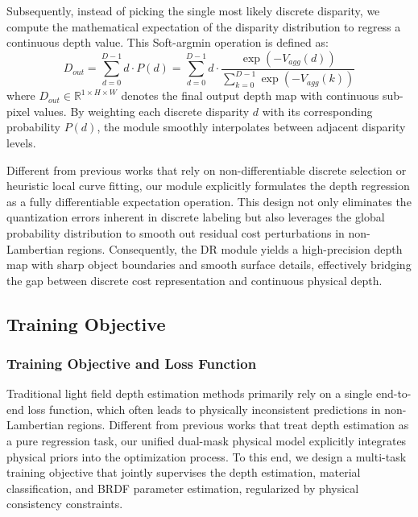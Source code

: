 Subsequently, instead of picking the single most likely discrete disparity, we compute the mathematical expectation of the disparity distribution to regress a continuous depth value. This Soft-argmin operation is defined as:
\begin{equation}
\label{eq:eq42}
D_{out} = \sum_{d=0}^{D-1} d \cdot P(d) = \sum_{d=0}^{D-1} d \cdot \frac{\exp(-V_{agg}(d))}{\sum_{k=0}^{D-1} \exp(-V_{agg}(k))}
\end{equation}
where $D_{out} \in \mathbb{R}^{1 \times H \times W}$ denotes the final output depth map with continuous sub-pixel values. By weighting each discrete disparity $d$ with its corresponding probability $P(d)$, the module smoothly interpolates between adjacent disparity levels.

Different from previous works that rely on non-differentiable discrete selection or heuristic local curve fitting, our module explicitly formulates the depth regression as a fully differentiable expectation operation. This design not only eliminates the quantization errors inherent in discrete labeling but also leverages the global probability distribution to smooth out residual cost perturbations in non-Lambertian regions. Consequently, the DR module yields a high-precision depth map with sharp object boundaries and smooth surface details, effectively bridging the gap between discrete cost representation and continuous physical depth.

\subsection{Training Objective}

\subsubsection{Training Objective and Loss Function}

Traditional light field depth estimation methods primarily rely on a single end-to-end loss function, which often leads to physically inconsistent predictions in non-Lambertian regions. Different from previous works that treat depth estimation as a pure regression task, our unified dual-mask physical model explicitly integrates physical priors into the optimization process. To this end, we design a multi-task training objective that jointly supervises the depth estimation, material classification, and BRDF parameter estimation, regularized by physical consistency constraints.

